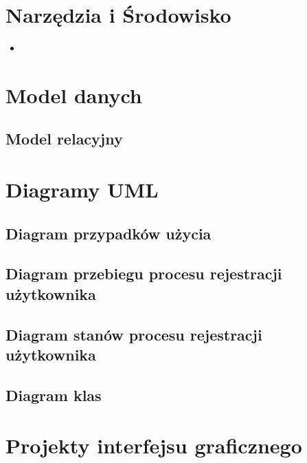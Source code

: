 \documentclass[a4paper,12pt,numbers=noenddot]{scrreprt}
\begin{document}




\setcounter{tocdepth}{1}
\tableofcontents
\cleardoubleemptypage
{}

\pagestyle{icmt-fancy}




\chapter{Narzędzia i Środowisko}
\begin{itemize}
  \item
\end{itemize}

\chapter{Model danych}

\section{Model relacyjny}


\chapter{Diagramy UML}

\section{Diagram przypadków użycia}


\section{Diagram przebiegu procesu rejestracji użytkownika}


\section{Diagram stanów procesu rejestracji użytkownika}


\section{Diagram klas}


\chapter{Projekty interfejsu graficznego}
\end{document}
